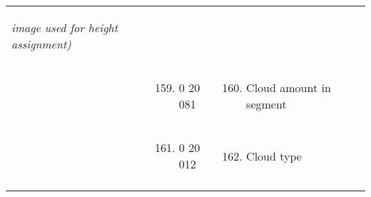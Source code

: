 \begin{longtable}[]{@{}llll@{}}
\begin{minipage}[t]{0.22\columnwidth}
\begin{enumerate}
  \emph{image used for height assignment)}
\end{enumerate}\strut
\end{minipage} & \begin{minipage}[t]{0.22\columnwidth}\raggedright
\strut
\end{minipage}\tabularnewline
\begin{minipage}[t]{0.22\columnwidth}\raggedright
\strut
\end{minipage} & \begin{minipage}[t]{0.22\columnwidth}\raggedright
\begin{enumerate}
\setcounter{enumi}{158}
\item
  0 20 081
\end{enumerate}\strut
\end{minipage} & \begin{minipage}[t]{0.22\columnwidth}\raggedright
\begin{enumerate}
\setcounter{enumi}{159}
\item
  Cloud amount in segment
\end{enumerate}\strut
\end{minipage} & \begin{minipage}[t]{0.22\columnwidth}\raggedright
\strut
\end{minipage}\tabularnewline
\begin{minipage}[t]{0.22\columnwidth}\raggedright
\strut
\end{minipage} & \begin{minipage}[t]{0.22\columnwidth}\raggedright
\begin{enumerate}
\setcounter{enumi}{160}
\item
  0 20 012
\end{enumerate}\strut
\end{minipage} & \begin{minipage}[t]{0.22\columnwidth}\raggedright
\begin{enumerate}
\setcounter{enumi}{161}
\item
  Cloud type
\end{enumerate}\strut
\end{minipage} & \begin{minipage}[t]{0.22\columnwidth}\raggedright
\strut
\end{minipage}\tabularnewline
\begin{minipage}[t]{0.22\columnwidth}\raggedright
\strut
\end{minipage} & \begin{minipage}[t]{0.22\columnwidth}\raggedright

\end{minipage}
\end{longtable}

